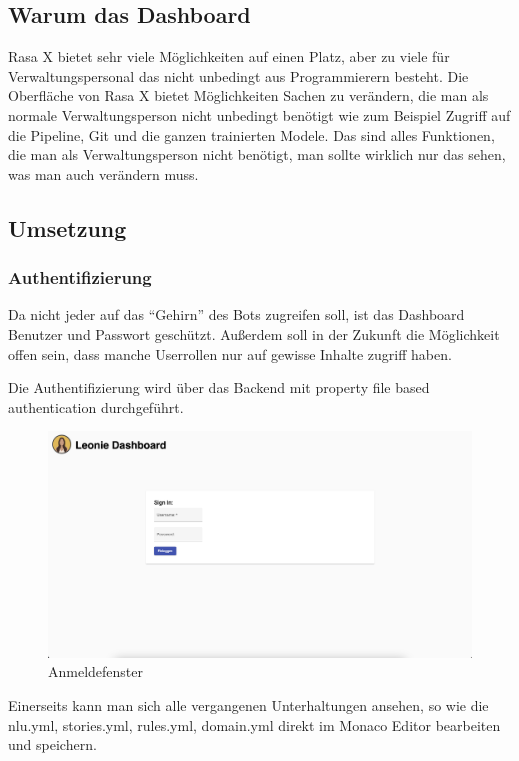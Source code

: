 \subsection{Warum das Dashboard}
Rasa X bietet sehr viele Möglichkeiten auf einen Platz, aber zu viele für Verwaltungspersonal das nicht unbedingt aus Programmierern besteht.
Die Oberfläche von Rasa X bietet Möglichkeiten Sachen zu verändern, die man als normale Verwaltungsperson nicht unbedingt benötigt wie zum Beispiel Zugriff auf die Pipeline, Git und die ganzen trainierten Modele.
Das sind alles Funktionen, die man als Verwaltungsperson nicht benötigt, man sollte wirklich nur das sehen, was man auch verändern muss.

\subsection{Umsetzung}

\subsubsection{Authentifizierung}
Da nicht jeder auf das ``Gehirn'' des Bots zugreifen soll, ist das Dashboard Benutzer und Passwort geschützt.
Außerdem soll in der Zukunft die Möglichkeit offen sein, dass manche Userrollen nur auf gewisse Inhalte zugriff haben.

Die Authentifizierung wird über das Backend mit property file based authentication\cite{authentication} durchgeführt.

\begin{figure}[hbt!]
    \centering
    \includegraphics[scale=0.2]{pics/signin}
    \caption{Anmeldefenster}
    \label{fig:impl:signin}
\end{figure}

Einerseits kann man sich alle vergangenen Unterhaltungen ansehen, so wie die nlu.yml, stories.yml, rules.yml, domain.yml direkt im Monaco Editor bearbeiten und speichern.

